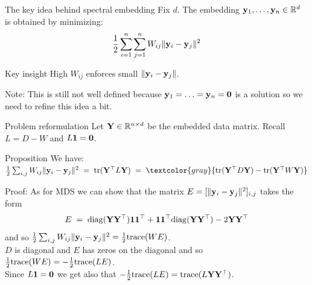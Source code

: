 \documentclass[11pt,handout,aspectratio=169]{beamer}
\begin{document}
\begin{frame}{The key idea behind spectral embedding}
Fix $d$. The embedding $\mathbf{y}_1,\ldots,\mathbf{y}_n\in \mathbb R^d$ is obtained by minimizing:
\[\frac{1}{2}\sum_{i=1}^n\sum_{j=1}^n W_{ij}\|\mathbf{y}_i - \mathbf{y}_j\|^2\]
\begin{alertblock}{Key insight}
	High $W_{ij}$ enforces small $\|\mathbf{y}_i-\mathbf{y}_j\|$.
\end{alertblock}
Note: This is still not well defined because $\mathbf{y}_1=\ldots=\mathbf{y}_n=\boldsymbol 0$ is a solution so we need to refine this idea a bit.  
\end{frame}


\begin{frame}{Problem reformulation}
Let $\mathbf{Y}\in \mathbb R^{n\times d}$ be the embedded data matrix. Recall $L=D-W$ and $L\boldsymbol 1=\boldsymbol 0$.
\begin{alertblock}{Proposition}
We have:\qquad $\frac{1}{2}\sum_{i,j} W_{ij}\|\y_i - \y_j\|^2 \;=\; \text{tr}(\Y^{\top} L \Y)\;=\;\textcolor{gray}{\text{tr}(\Y^{\top} D \Y)-\text{tr}(\Y^{\top} W \Y)}$
\end{alertblock}
Proof: As for MDS we can show that the matrix $E=[\|\mathbf{y}_i-\mathbf{y}_j\|^2]_{i,j}$ takes the form
$$
E\;=\;{\rm diag}(\mathbf{Y}\mathbf{Y}^\top)\boldsymbol 1\boldsymbol 1^\top+\boldsymbol 1\boldsymbol 1^\top{\rm diag}(\mathbf{Y}\mathbf{Y}^\top)-2\mathbf{Y}\mathbf{Y}^\top
$$
and so $\tfrac12 \sum_{i,j}W_{ij}\|\mathbf{y}_i-\mathbf{y}_j\|^2 = \tfrac12\text{trace}(W E)$.\\[2mm]	
$D$ is diagonal and $E$ has zeros on the diagonal and so $\tfrac12\text{trace}(W E)=-\tfrac12\text{trace}(L E)$.\\[2mm]
	Since $L\boldsymbol 1=\boldsymbol 0$ we get also that $-\tfrac12\text{trace}(L E)=\text{trace}(L\mathbf{Y}\mathbf{Y}^\top)$. 
\end{frame}
\end{document}
